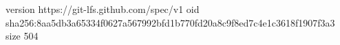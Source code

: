 version https://git-lfs.github.com/spec/v1
oid sha256:8aa5db3a65334f0627a567992bfd1b770fd20a8c9f8ed7c4e1c3618f1907f3a3
size 504
